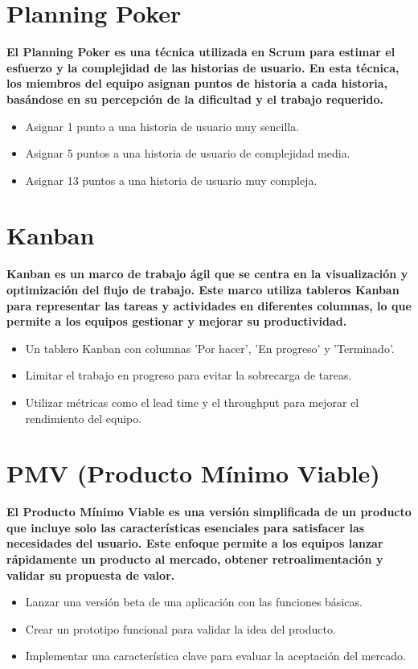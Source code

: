 \documentclass[twocolumn]{article}
\begin{document}
\section*{Planning Poker}
\textbf{El Planning Poker es una técnica utilizada en Scrum para estimar el esfuerzo y la complejidad de las historias de usuario. En esta técnica, los miembros del equipo asignan puntos de historia a cada historia, basándose en su percepción de la dificultad y el trabajo requerido.}
\begin{itemize}[label=\textbullet]
\item Asignar 1 punto a una historia de usuario muy sencilla.
\item Asignar 5 puntos a una historia de usuario de complejidad media.
\item Asignar 13 puntos a una historia de usuario muy compleja.
\end{itemize}
\section*{Kanban}
\textbf{Kanban es un marco de trabajo ágil que se centra en la visualización y optimización del flujo de trabajo. Este marco utiliza tableros Kanban para representar las tareas y actividades en diferentes columnas, lo que permite a los equipos gestionar y mejorar su productividad.}
\begin{itemize}[label=\textbullet]
\item Un tablero Kanban con columnas 'Por hacer', 'En progreso' y 'Terminado'.
\item Limitar el trabajo en progreso para evitar la sobrecarga de tareas.
\item Utilizar métricas como el lead time y el throughput para mejorar el rendimiento del equipo.
\end{itemize}
\section*{PMV (Producto Mínimo Viable)}
\textbf{El Producto Mínimo Viable es una versión simplificada de un producto que incluye solo las características esenciales para satisfacer las necesidades del usuario. Este enfoque permite a los equipos lanzar rápidamente un producto al mercado, obtener retroalimentación y validar su propuesta de valor.}
\begin{itemize}[label=\textbullet]
\item Lanzar una versión beta de una aplicación con las funciones básicas.
\item Crear un prototipo funcional para validar la idea del producto.
\item Implementar una característica clave para evaluar la aceptación del mercado.
\end{itemize}
\end{document}

